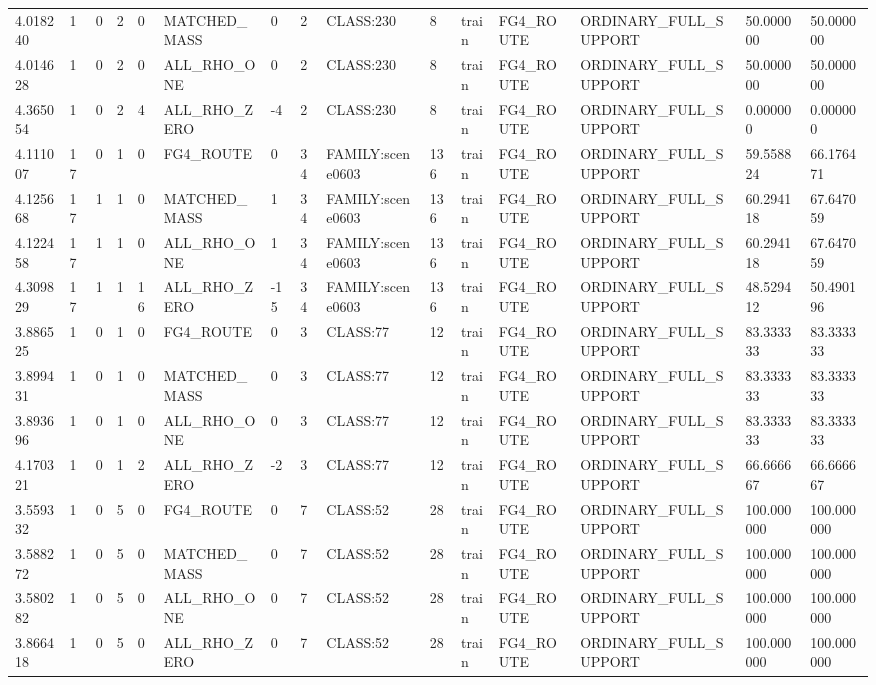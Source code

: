 \begin{tabular}{lllllllllllllll}
4.018240 & 1 & 0 & 2 & 0 & MATCHED\_MASS & 0 & 2 & CLASS:230 & 8 & train & FG4\_ROUTE & ORDINARY\_FULL\_SUPPORT & 50.000000 & 50.000000 \\
4.014628 & 1 & 0 & 2 & 0 & ALL\_RHO\_ONE & 0 & 2 & CLASS:230 & 8 & train & FG4\_ROUTE & ORDINARY\_FULL\_SUPPORT & 50.000000 & 50.000000 \\
4.365054 & 1 & 0 & 2 & 4 & ALL\_RHO\_ZERO & -4 & 2 & CLASS:230 & 8 & train & FG4\_ROUTE & ORDINARY\_FULL\_SUPPORT & 0.000000 & 0.000000 \\
4.111007 & 17 & 0 & 1 & 0 & FG4\_ROUTE & 0 & 34 & FAMILY:scene0603 & 136 & train & FG4\_ROUTE & ORDINARY\_FULL\_SUPPORT & 59.558824 & 66.176471 \\
4.125668 & 17 & 1 & 1 & 0 & MATCHED\_MASS & 1 & 34 & FAMILY:scene0603 & 136 & train & FG4\_ROUTE & ORDINARY\_FULL\_SUPPORT & 60.294118 & 67.647059 \\
4.122458 & 17 & 1 & 1 & 0 & ALL\_RHO\_ONE & 1 & 34 & FAMILY:scene0603 & 136 & train & FG4\_ROUTE & ORDINARY\_FULL\_SUPPORT & 60.294118 & 67.647059 \\
4.309829 & 17 & 1 & 1 & 16 & ALL\_RHO\_ZERO & -15 & 34 & FAMILY:scene0603 & 136 & train & FG4\_ROUTE & ORDINARY\_FULL\_SUPPORT & 48.529412 & 50.490196 \\
3.886525 & 1 & 0 & 1 & 0 & FG4\_ROUTE & 0 & 3 & CLASS:77 & 12 & train & FG4\_ROUTE & ORDINARY\_FULL\_SUPPORT & 83.333333 & 83.333333 \\
3.899431 & 1 & 0 & 1 & 0 & MATCHED\_MASS & 0 & 3 & CLASS:77 & 12 & train & FG4\_ROUTE & ORDINARY\_FULL\_SUPPORT & 83.333333 & 83.333333 \\
3.893696 & 1 & 0 & 1 & 0 & ALL\_RHO\_ONE & 0 & 3 & CLASS:77 & 12 & train & FG4\_ROUTE & ORDINARY\_FULL\_SUPPORT & 83.333333 & 83.333333 \\
4.170321 & 1 & 0 & 1 & 2 & ALL\_RHO\_ZERO & -2 & 3 & CLASS:77 & 12 & train & FG4\_ROUTE & ORDINARY\_FULL\_SUPPORT & 66.666667 & 66.666667 \\
3.559332 & 1 & 0 & 5 & 0 & FG4\_ROUTE & 0 & 7 & CLASS:52 & 28 & train & FG4\_ROUTE & ORDINARY\_FULL\_SUPPORT & 100.000000 & 100.000000 \\
3.588272 & 1 & 0 & 5 & 0 & MATCHED\_MASS & 0 & 7 & CLASS:52 & 28 & train & FG4\_ROUTE & ORDINARY\_FULL\_SUPPORT & 100.000000 & 100.000000 \\
3.580282 & 1 & 0 & 5 & 0 & ALL\_RHO\_ONE & 0 & 7 & CLASS:52 & 28 & train & FG4\_ROUTE & ORDINARY\_FULL\_SUPPORT & 100.000000 & 100.000000 \\
3.866418 & 1 & 0 & 5 & 0 & ALL\_RHO\_ZERO & 0 & 7 & CLASS:52 & 28 & train & FG4\_ROUTE & ORDINARY\_FULL\_SUPPORT & 100.000000 & 100.000000 \\

\end{tabular}
